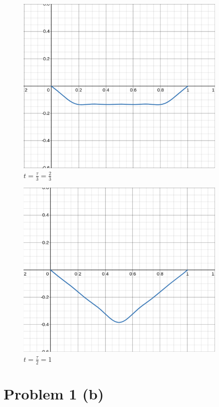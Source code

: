 \documentclass[letter]{article}
\begin{document}
\hfill %
\begin{minipage}{0.5\textwidth}
\begin{figure}[H]
	\centering
	\includegraphics[width=0.9\textwidth]{ss/c_n_02.png}
	\caption{$t = \frac{\tau}{3} = \frac{2}{3}$}
	\label{fig:ss-c_n_01-png}
\end{figure}
\begin{figure}[H]
	\centering
	\includegraphics[width=0.9\textwidth]{ss/c_n_03.png}
	\caption{$t = \frac{\tau}{2} = 1$}
	\label{fig:ss-c_n_01-png}
\end{figure}
\end{minipage}
\newpage

\section*{Problem 1 (b)} 
\end{document}
